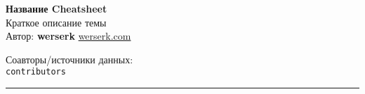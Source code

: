 \documentclass[10pt,landscape,a4paper]{article}
\begin{document}
\begin{center}
    {\Huge\bfseries Название Cheatsheet}\\[0.5cm]
    {\large Краткое описание темы}\\[0.3cm]
    \vspace{0.2cm}
    {\small Автор: {\bfseries werserk} \textbar{} \href{https://werserk.com}{werserk.com}}
    \par\vspace{0.1cm}
    {\small Соавторы/источники данных: \texttt{\\contributors}}
    \par\vspace{0.3cm}
    \rule{\textwidth}{1pt}
\end{center}

\providecommand{\contributors}{}
\end{document}
